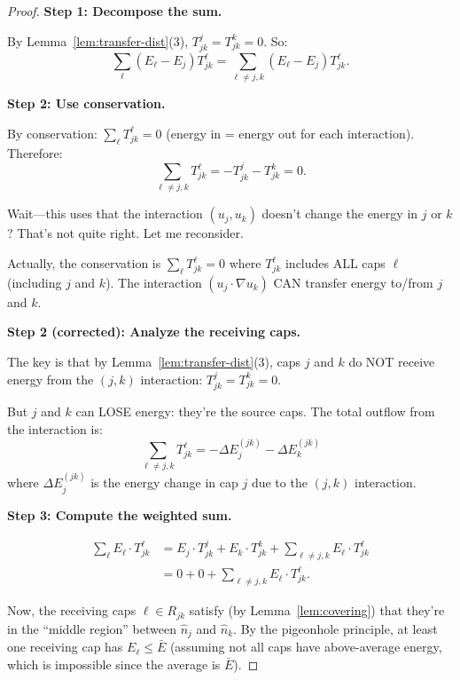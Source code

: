 \documentclass[11pt]{article}
\theoremstyle{definition}
\begin{document}
\begin{proof}
\textbf{Step 1: Decompose the sum.}

By Lemma~\ref{lem:transfer-dist}(3), $T_{jk}^j = T_{jk}^k = 0$. So:
\begin{equation}
\sum_\ell (E_\ell - E_j) T_{jk}^\ell = \sum_{\ell \neq j, k} (E_\ell - E_j) T_{jk}^\ell.
\end{equation}

\textbf{Step 2: Use conservation.}

By conservation: $\sum_\ell T_{jk}^\ell = 0$ (energy in = energy out for each interaction). Therefore:
\begin{equation}
\sum_{\ell \neq j,k} T_{jk}^\ell = -T_{jk}^j - T_{jk}^k = 0.
\end{equation}

Wait---this uses that the interaction $(u_j, u_k)$ doesn't change the energy in $j$ or $k$? That's not quite right. Let me reconsider.

Actually, the conservation is $\sum_\ell T_{jk}^\ell = 0$ where $T_{jk}^\ell$ includes ALL caps $\ell$ (including $j$ and $k$). The interaction $(u_j \cdot \nabla u_k)$ CAN transfer energy to/from $j$ and $k$.

\textbf{Step 2 (corrected): Analyze the receiving caps.}

The key is that by Lemma~\ref{lem:transfer-dist}(3), caps $j$ and $k$ do NOT receive energy from the $(j,k)$ interaction: $T_{jk}^j = T_{jk}^k = 0$.

But $j$ and $k$ can LOSE energy: they're the source caps. The total outflow from the interaction is:
\begin{equation}
\sum_{\ell \neq j, k} T_{jk}^\ell = -\Delta E_j^{(jk)} - \Delta E_k^{(jk)}
\end{equation}
where $\Delta E_j^{(jk)}$ is the energy change in cap $j$ due to the $(j,k)$ interaction.

\textbf{Step 3: Compute the weighted sum.}

\begin{align}
\sum_\ell E_\ell \cdot T_{jk}^\ell &= E_j \cdot T_{jk}^j + E_k \cdot T_{jk}^k + \sum_{\ell \neq j,k} E_\ell \cdot T_{jk}^\ell \\
&= 0 + 0 + \sum_{\ell \neq j,k} E_\ell \cdot T_{jk}^\ell.
\end{align}

Now, the receiving caps $\ell \in R_{jk}$ satisfy (by Lemma~\ref{lem:covering}) that they're in the ``middle region'' between $\hat{n}_j$ and $\hat{n}_k$. By the pigeonhole principle, at least one receiving cap has $E_\ell \leq \bar{E}$ (assuming not all caps have above-average energy, which is impossible since the average is $\bar{E}$).


\end{proof}
\end{document}
